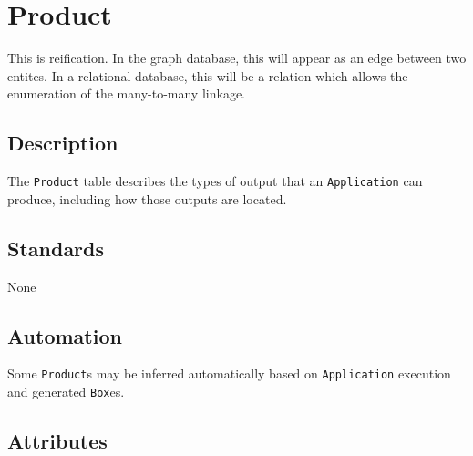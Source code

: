 \documentclass[
]{article}
\begin{document}
\section{Product}\label{product}

This is reification. In the graph database, this will appear as an edge
between two entites. In a relational database, this will be a relation
which allows the enumeration of the many-to-many linkage.

\subsection{Description}\label{description-24}

The \texttt{Product} table describes the types of output that an
\texttt{Application} can produce, including how those outputs are
located.

\subsection{Standards}\label{standards-26}

None

\subsection{Automation}\label{automation-26}

Some \texttt{Product}s may be inferred automatically based on
\texttt{Application} execution and generated \texttt{Box}es.

\subsection{Attributes}\label{attributes-23}
\end{document}
